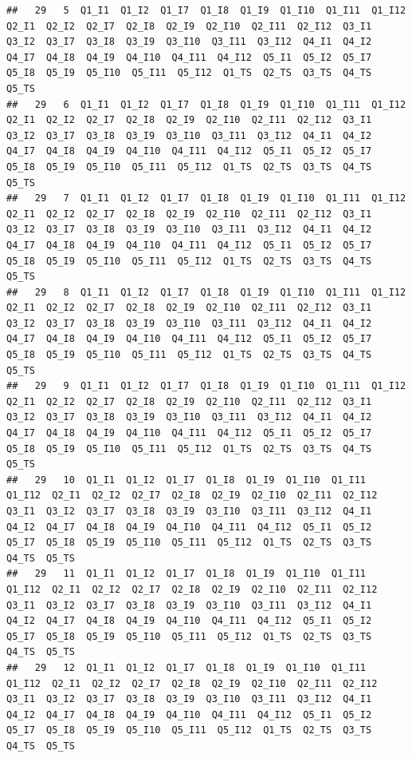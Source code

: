 \documentclass[
]{book}
\begin{document}
\begin{verbatim}
##   29   5  Q1_I1  Q1_I2  Q1_I7  Q1_I8  Q1_I9  Q1_I10  Q1_I11  Q1_I12  Q2_I1  Q2_I2  Q2_I7  Q2_I8  Q2_I9  Q2_I10  Q2_I11  Q2_I12  Q3_I1  Q3_I2  Q3_I7  Q3_I8  Q3_I9  Q3_I10  Q3_I11  Q3_I12  Q4_I1  Q4_I2  Q4_I7  Q4_I8  Q4_I9  Q4_I10  Q4_I11  Q4_I12  Q5_I1  Q5_I2  Q5_I7  Q5_I8  Q5_I9  Q5_I10  Q5_I11  Q5_I12  Q1_TS  Q2_TS  Q3_TS  Q4_TS  Q5_TS
##   29   6  Q1_I1  Q1_I2  Q1_I7  Q1_I8  Q1_I9  Q1_I10  Q1_I11  Q1_I12  Q2_I1  Q2_I2  Q2_I7  Q2_I8  Q2_I9  Q2_I10  Q2_I11  Q2_I12  Q3_I1  Q3_I2  Q3_I7  Q3_I8  Q3_I9  Q3_I10  Q3_I11  Q3_I12  Q4_I1  Q4_I2  Q4_I7  Q4_I8  Q4_I9  Q4_I10  Q4_I11  Q4_I12  Q5_I1  Q5_I2  Q5_I7  Q5_I8  Q5_I9  Q5_I10  Q5_I11  Q5_I12  Q1_TS  Q2_TS  Q3_TS  Q4_TS  Q5_TS
##   29   7  Q1_I1  Q1_I2  Q1_I7  Q1_I8  Q1_I9  Q1_I10  Q1_I11  Q1_I12  Q2_I1  Q2_I2  Q2_I7  Q2_I8  Q2_I9  Q2_I10  Q2_I11  Q2_I12  Q3_I1  Q3_I2  Q3_I7  Q3_I8  Q3_I9  Q3_I10  Q3_I11  Q3_I12  Q4_I1  Q4_I2  Q4_I7  Q4_I8  Q4_I9  Q4_I10  Q4_I11  Q4_I12  Q5_I1  Q5_I2  Q5_I7  Q5_I8  Q5_I9  Q5_I10  Q5_I11  Q5_I12  Q1_TS  Q2_TS  Q3_TS  Q4_TS  Q5_TS
##   29   8  Q1_I1  Q1_I2  Q1_I7  Q1_I8  Q1_I9  Q1_I10  Q1_I11  Q1_I12  Q2_I1  Q2_I2  Q2_I7  Q2_I8  Q2_I9  Q2_I10  Q2_I11  Q2_I12  Q3_I1  Q3_I2  Q3_I7  Q3_I8  Q3_I9  Q3_I10  Q3_I11  Q3_I12  Q4_I1  Q4_I2  Q4_I7  Q4_I8  Q4_I9  Q4_I10  Q4_I11  Q4_I12  Q5_I1  Q5_I2  Q5_I7  Q5_I8  Q5_I9  Q5_I10  Q5_I11  Q5_I12  Q1_TS  Q2_TS  Q3_TS  Q4_TS  Q5_TS
##   29   9  Q1_I1  Q1_I2  Q1_I7  Q1_I8  Q1_I9  Q1_I10  Q1_I11  Q1_I12  Q2_I1  Q2_I2  Q2_I7  Q2_I8  Q2_I9  Q2_I10  Q2_I11  Q2_I12  Q3_I1  Q3_I2  Q3_I7  Q3_I8  Q3_I9  Q3_I10  Q3_I11  Q3_I12  Q4_I1  Q4_I2  Q4_I7  Q4_I8  Q4_I9  Q4_I10  Q4_I11  Q4_I12  Q5_I1  Q5_I2  Q5_I7  Q5_I8  Q5_I9  Q5_I10  Q5_I11  Q5_I12  Q1_TS  Q2_TS  Q3_TS  Q4_TS  Q5_TS
##   29   10  Q1_I1  Q1_I2  Q1_I7  Q1_I8  Q1_I9  Q1_I10  Q1_I11  Q1_I12  Q2_I1  Q2_I2  Q2_I7  Q2_I8  Q2_I9  Q2_I10  Q2_I11  Q2_I12  Q3_I1  Q3_I2  Q3_I7  Q3_I8  Q3_I9  Q3_I10  Q3_I11  Q3_I12  Q4_I1  Q4_I2  Q4_I7  Q4_I8  Q4_I9  Q4_I10  Q4_I11  Q4_I12  Q5_I1  Q5_I2  Q5_I7  Q5_I8  Q5_I9  Q5_I10  Q5_I11  Q5_I12  Q1_TS  Q2_TS  Q3_TS  Q4_TS  Q5_TS
##   29   11  Q1_I1  Q1_I2  Q1_I7  Q1_I8  Q1_I9  Q1_I10  Q1_I11  Q1_I12  Q2_I1  Q2_I2  Q2_I7  Q2_I8  Q2_I9  Q2_I10  Q2_I11  Q2_I12  Q3_I1  Q3_I2  Q3_I7  Q3_I8  Q3_I9  Q3_I10  Q3_I11  Q3_I12  Q4_I1  Q4_I2  Q4_I7  Q4_I8  Q4_I9  Q4_I10  Q4_I11  Q4_I12  Q5_I1  Q5_I2  Q5_I7  Q5_I8  Q5_I9  Q5_I10  Q5_I11  Q5_I12  Q1_TS  Q2_TS  Q3_TS  Q4_TS  Q5_TS
##   29   12  Q1_I1  Q1_I2  Q1_I7  Q1_I8  Q1_I9  Q1_I10  Q1_I11  Q1_I12  Q2_I1  Q2_I2  Q2_I7  Q2_I8  Q2_I9  Q2_I10  Q2_I11  Q2_I12  Q3_I1  Q3_I2  Q3_I7  Q3_I8  Q3_I9  Q3_I10  Q3_I11  Q3_I12  Q4_I1  Q4_I2  Q4_I7  Q4_I8  Q4_I9  Q4_I10  Q4_I11  Q4_I12  Q5_I1  Q5_I2  Q5_I7  Q5_I8  Q5_I9  Q5_I10  Q5_I11  Q5_I12  Q1_TS  Q2_TS  Q3_TS  Q4_TS  Q5_TS

\end{verbatim}
\end{document}
